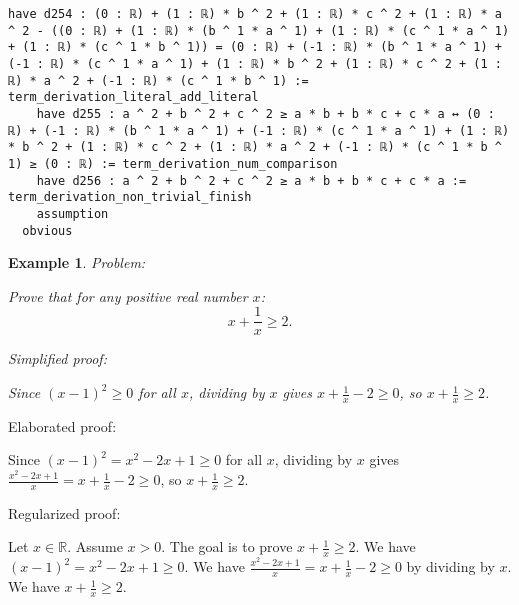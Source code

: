 \documentclass{article}
\newtheorem{example}{Example}
\begin{document}
\begin{tcolorbox}[colback=white!10, width=\linewidth]
\begin{lstlisting}[language=Lean4]
    have d254 : (0 : ℝ) + (1 : ℝ) * b ^ 2 + (1 : ℝ) * c ^ 2 + (1 : ℝ) * a ^ 2 - ((0 : ℝ) + (1 : ℝ) * (b ^ 1 * a ^ 1) + (1 : ℝ) * (c ^ 1 * a ^ 1) + (1 : ℝ) * (c ^ 1 * b ^ 1)) = (0 : ℝ) + (-1 : ℝ) * (b ^ 1 * a ^ 1) + (-1 : ℝ) * (c ^ 1 * a ^ 1) + (1 : ℝ) * b ^ 2 + (1 : ℝ) * c ^ 2 + (1 : ℝ) * a ^ 2 + (-1 : ℝ) * (c ^ 1 * b ^ 1) := term_derivation_literal_add_literal
    have d255 : a ^ 2 + b ^ 2 + c ^ 2 ≥ a * b + b * c + c * a ↔ (0 : ℝ) + (-1 : ℝ) * (b ^ 1 * a ^ 1) + (-1 : ℝ) * (c ^ 1 * a ^ 1) + (1 : ℝ) * b ^ 2 + (1 : ℝ) * c ^ 2 + (1 : ℝ) * a ^ 2 + (-1 : ℝ) * (c ^ 1 * b ^ 1) ≥ (0 : ℝ) := term_derivation_num_comparison
    have d256 : a ^ 2 + b ^ 2 + c ^ 2 ≥ a * b + b * c + c * a := term_derivation_non_trivial_finish
    assumption
  obvious

\end{lstlisting}
\end{tcolorbox}


\begin{example}
Problem:
\begin{tcolorbox}[colback=yellow!10, width=\linewidth]
Prove that for any positive real number $x$:
    $$x + \frac{1}{x} \geq 2.$$
\end{tcolorbox}

Simplified proof:
\begin{tcolorbox}[colback=blue!10, width=\linewidth]
Since $(x-1)^2 \ge 0$ for all $x$, dividing by $x$ gives $x + \frac{1}{x} - 2 \ge 0$, so $x + \frac{1}{x} \ge 2$.
\end{tcolorbox}
\end{example}

Elaborated proof:
\begin{tcolorbox}[colback=green!10, width=\linewidth]
Since $(x-1)^2 = x^2 - 2x + 1 \ge 0$ for all $x$, dividing by $x$ gives $\frac{x^2 - 2x + 1}{x} = x + \frac{1}{x} - 2 \ge 0$, so $x + \frac{1}{x} \ge 2$.
\end{tcolorbox}

Regularized proof:
\begin{tcolorbox}[colback=red!10, width=\linewidth]
Let $x\in\mathbb{R}$. Assume $x>0$.
The goal is to prove $x + \frac{1}{x} \ge 2$.
We have ${\left(x-1\right)}^2 = x^2 - 2x + 1 \ge 0$.
We have $\frac{x^2 - 2x + 1}{x} = x + \frac{1}{x} - 2 \ge 0$ by dividing by $x$.
We have $x + \frac{1}{x} \ge 2$.
\end{tcolorbox}
\end{document}
